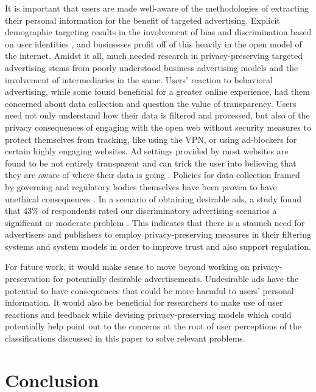 \documentclass[sigconf,nonacm]{acmart}
\begin{document}
It is important that users are made well-aware of the methodologies of extracting their personal information for the benefit of targeted advertising. Explicit demographic targeting results in the involvement of bias and discrimination based on user identities \cite{userperception}, and businesses profit off of this heavily in the open model of the internet. Amidst it all, much needed research in privacy-preserving targeted advertising stems from poorly understood business advertising models and the involvement of intermediaries in the same. Users’ reaction to behavioral advertising, while some found beneficial for a greater online experience, had them concerned about data collection and question the value of transparency. Users need not only understand how their data is filtered and processed, but also of the privacy consequences of engaging with the open web without security measures to protect themselves from tracking, like using the VPN, or using ad-blockers for certain highly engaging websites. Ad settings provided by most websites are found to be not entirely transparent and can trick the user into believing that they are aware of where their data is going \cite{automatedexp}. Policies for data collection framed by governing and regulatory bodies themselves have been proven to have unethical consequences \cite{liao2020privacy}. In a scenario of obtaining desirable ads, a study found that  43\% of respondents rated our discriminatory advertising scenarios a significant or moderate problem \cite{userperception}. This indicates that there is a staunch need for advertisers and publishers to employ privacy-preserving measures in their filtering systems and system models in order to improve trust and also support regulation.

For future work, it would make sense to move beyond working on privacy-preservation for potentially desirable advertisements. Undesirable ads have the potential to have consequences that could be more harmful to users’ personal information. It would also be beneficial for researchers to make use of user reactions and feedback while devising privacy-preserving models which could potentially help point out to the concerns at the root of user perceptions of the classifications discussed in this paper to solve relevant problems.

\section{Conclusion}
\end{document}
